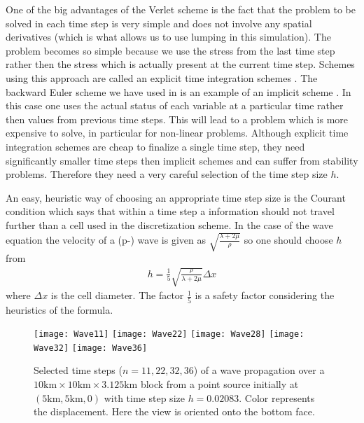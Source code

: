 One of the big advantages of the Verlet scheme is the fact that the problem to be solved 
in each time step is very simple and does not involve any spatial derivatives (which is what allows us to use lumping in this simulation).
The problem becomes so simple because we use the stress from the last time step rather then the stress which is
actually present at the current time step. Schemes using this approach are called an explicit time integration 
schemes  . The 
backward Euler scheme we have used in  is 
an example of an implicit scheme
 . In this case one uses the actual status of 
each variable at a particular time rather then values from previous time steps. This will lead to a problem which is 
more expensive to solve, in particular for non-linear problems. 
Although 
explicit time integration schemes are cheap to finalize a single time step, they need significantly smaller time
steps then implicit schemes and can suffer from stability problems. Therefore they need a 
very careful selection of the time step size $h$.

An easy, heuristic way of choosing an appropriate
time step size is the Courant condition  
which says that within a time step a information should not travel further than a cell used in the 
discretization scheme. In the case of the wave equation the velocity of a (p-) wave is given as
$\sqrt{\frac{\lambda+2\mu}{\rho}}$ so one should choose $h$ from
\begin{eqnarray}\label{WAVE dyn 66}
h= \frac{1}{5} \sqrt{\frac{\rho}{\lambda+2\mu}} \Delta x
\end{eqnarray}
where $\Delta x$ is the cell diameter. The factor $\frac{1}{5}$ is a safety factor considering the heuristics of 
the formula. 

\begin{figure}[t]
\begin{center}
\texttt{[image: Wave11]}
\texttt{[image: Wave22]}
\texttt{[image: Wave28]}
\texttt{[image: Wave32]}
\texttt{[image: Wave36]}
\end{center}
\caption{Selected time steps ($n = 11, 22, 32, 36$) of a wave propagation over a $10\mbox{km} \times 10\mbox{km} \times 3.125\mbox{km}$ block 
from a point source initially at $(5\mbox{km},5\mbox{km},0)$
with time step size $h=0.02083$. Color represents the displacement.
Here the view is oriented onto the bottom face.
\label{WAVE FIG 2}}
\end{figure}

